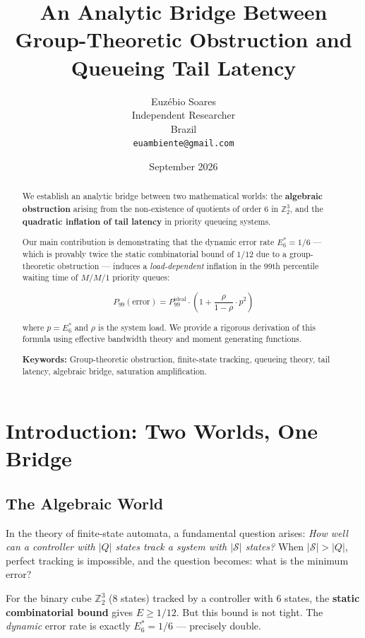 \documentclass[11pt]{article}
\title{An Analytic Bridge Between Group-Theoretic Obstruction and Queueing Tail Latency}
\author{Euz\'{e}bio Soares \\
Independent Researcher \\
Brazil \\
\texttt{euambiente@gmail.com}}
\date{September 2026}
\begin{document}
\maketitle

\begin{abstract}
We establish an analytic bridge between two mathematical worlds: the \textbf{algebraic obstruction} arising from the non-existence of quotients of order 6 in $\mathbb{Z}_2^3$, and the \textbf{quadratic inflation of tail latency} in priority queueing systems. 

Our main contribution is demonstrating that the dynamic error rate $E_6^* = 1/6$ --- which is provably twice the static combinatorial bound of $1/12$ due to a group-theoretic obstruction --- induces a \textit{load-dependent} inflation in the 99th percentile waiting time of $M/M/1$ priority queues:

$$P_{99}(\text{error}) = P_{99}^{\text{ideal}} \cdot \left(1 + \frac{\rho}{1-\rho} \cdot p^2\right)$$

where $p = E_6^*$ and $\rho$ is the system load. We provide a rigorous derivation of this formula using effective bandwidth theory and moment generating functions.

\textbf{Keywords:} Group-theoretic obstruction, finite-state tracking, queueing theory, tail latency, algebraic bridge, saturation amplification.
\end{abstract}

\section{Introduction: Two Worlds, One Bridge}

\subsection{The Algebraic World}

In the theory of finite-state automata, a fundamental question arises: \textit{How well can a controller with $|Q|$ states track a system with $|\mathcal{S}|$ states?} When $|\mathcal{S}| > |Q|$, perfect tracking is impossible, and the question becomes: what is the minimum error?

For the binary cube $\mathbb{Z}_2^3$ (8 states) tracked by a controller with 6 states, the \textbf{static combinatorial bound} gives $E \geq 1/12$. But this bound is not tight. The \textit{dynamic} error rate is exactly $E_6^* = 1/6$ --- precisely double.
\end{document}
